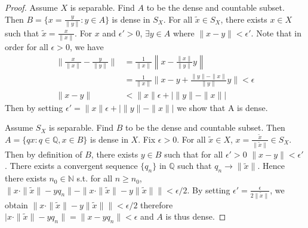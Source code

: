\documentclass[a4paper, 11pt]{article}
\newcommand{\Q}{\mathbb{Q}}
\newcommand{\N}{\mathbb{N}}
\theoremstyle{definition}
\begin{document}
\begin{proof}
    Assume $X$ is separable. Find $A$ to be the dense and countable subset. Then $B=\{x=\frac{y}{\|y\|}:y\in A\}$ is dense in $S_X$. For all $\tilde x\in S_X$, 
    there exists $x\in X$ such that $\tilde x=\frac{x}{\|x\|}$. For $x$ and $\epsilon'>0$, $\exists y\in A$ where $\|x-y\|<\epsilon'$.
    Note that in order for all $\epsilon>0$, we have
    \begin{align*}
        \|\frac{x}{\|x\|}-\frac{y}{\|y\|}\|&= \frac{1}{\|x\|}\left\|x-\frac{\|x\|}{\|y\|}y\right\|\\
        &= \frac{1}{\|x\|}\|x-y+\frac{\|y\|-\|x\|}{\|y\|}y\|<\epsilon\\
        \|{x}-{y}\|&<\|x\|\epsilon+\big |\|y\|-\|x\|\big |
    \end{align*}
    Then by setting $\epsilon'=\|x\|\epsilon+\big |\|y\|-\|x\|\big |$ we show that A is dense.

    Assume $S_X$ is separable. Find $B$ to be the dense and countable subset. Then $A=\{qx:q\in \Q, x\in B\}$ is dense in $X$. Fix $\epsilon>0$. For all $\tilde x \in X$, $x=\frac{\tilde x}{\|\tilde x\|}\in S_X$.
    Then by definition of $B$, there exists $y\in B$ such that for all $\epsilon'>0$ $\|x-y\|<\epsilon'$. There exists a convergent sequence $\{q_n\}$ in $\Q$ such that $q_n\to \|\tilde x\|$.
    Hence there exists $n_0\in \N$ s.t. for all $n\ge n_0$, $\|x\cdot \|\tilde x\| - yq_n\| - \|x\cdot \|\tilde x\| - y\|\tilde x\|\|<\epsilon/2$. By setting $\epsilon'=\frac{\epsilon}{2\|\tilde x\|}$, 
    we obtain $\|x\cdot \|\tilde x\| - y\|\tilde x\|\|<\epsilon/2$ therefore $|x\cdot \|\tilde x\| - yq_n\|=\|x-yq_n\|<\epsilon$ and $A$ is thus dense.
\end{proof}
\end{document}

